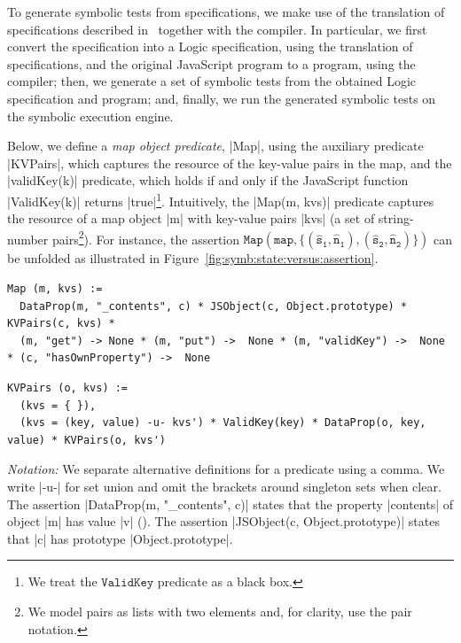 To generate symbolic tests from \javert specifications, we make use of the translation of specifications 
described in~\cite{javert} together with the \JSComp compiler. In particular, we first convert the \javert specification into a \jsil Logic specification, 
using the translation of specifications, and the original JavaScript program to a \jsil program, using the \JSComp compiler; then, we 
generate a set of symbolic tests from the obtained \jsil Logic specification and \jsil program; 
and, finally, we run the generated \jsil symbolic tests on the \jsil symbolic execution engine. 




Below, we define a \emph{map object predicate}, \jsinline|Map|, 
using the auxiliary predicate \jsinline|KVPairs|, which captures the resource of the key-value pairs in the map, 
and the \jsinline|validKey(k)| predicate, which holds if and only if the 
JavaScript function \jsinline|ValidKey(k)| returns \jsinline|true|\footnote{We treat the $\mathtt{ValidKey}$ predicate as a black box.}.
%
Intuitively, the \jsinline|Map(m, kvs)| predicate captures the resource 
of a map object \jsinline|m| with key-value pairs \jsinline|kvs| (a set of string-number pairs\footnote{We model pairs as lists with two elements and, for clarity, use the pair notation.}). 
For instance, the assertion $\mathtt{Map(map, \{ (\hat{s}_1, \hat{n}_1), (\hat{s}_2, \hat{n}_2) \} )}$ can be unfolded
as illustrated in Figure~\ref{fig:symb:state:versus:assertion}. 
%

{\scriptsize
 \begin{verbatim}
Map (m, kvs) := 
  DataProp(m, "_contents", c) * JSObject(c, Object.prototype) * KVPairs(c, kvs) *
  (m, "get") -> None * (m, "put") ->  None * (m, "validKey") ->  None  * (c, "hasOwnProperty") ->  None 
  \end{verbatim}
  \vspace*{-0.8cm}
 \begin{verbatim}
KVPairs (o, kvs) := 
  (kvs = { }),
  (kvs = (key, value) -u- kvs') * ValidKey(key) * DataProp(o, key, value) * KVPairs(o, kvs')
\end{verbatim}}
%
\noindent \emph{Notation:}  We separate alternative definitions for a predicate using a comma. 
We write \jsinline|-u-| for set union and omit the brackets around singleton sets when clear. 
%
The assertion \jsinline|DataProp(m, "_contents", c)| states that the property \jsinline|contents| of object \jsinline|m| has value
\jsinline|v| (). 
The assertion \jsinline|JSObject(c, Object.prototype)|  states that \jsinline|c| has prototype \jsinline|Object.prototype|.
%

